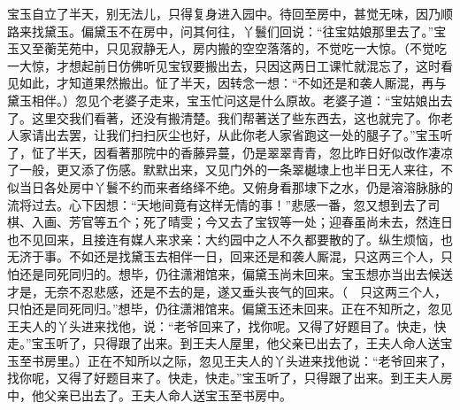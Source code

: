 \begin{parag}
    宝玉自立了半天，别无法儿，只得复身进入园中。待回至房中，甚觉无味，因乃顺路来找黛玉。偏黛玉不在房中，问其何往，丫鬟们回说：“往宝姑娘那里去了。”宝玉又至蘅芜苑中，只见寂静无人，房内搬的空空落落的，不觉吃一大惊。（不觉吃一大惊，才想起前日仿佛听见宝钗要搬出去，只因这两日工课忙就混忘了，这时看见如此，才知道果然搬出。怔了半天，因转念一想：“不如还是和袭人厮混，再与黛玉相伴。）忽见个老婆子走来，宝玉忙问这是什么原故。老婆子道：“宝姑娘出去了。这里交我们看著，还没有搬清楚。我们帮著送了些东西去，这也就完了。你老人家请出去罢，让我们扫扫灰尘也好，从此你老人家省跑这一处的腿子了。”宝玉听了，怔了半天，因看著那院中的香藤异蔓，仍是翠翠青青，忽比昨日好似改作凄凉了一般，更又添了伤感。默默出来，又见门外的一条翠樾埭上也半日无人来往，不似当日各处房中丫鬟不约而来者络绎不绝。又俯身看那埭下之水，仍是溶溶脉脉的流将过去。心下因想：“天地间竟有这样无情的事！”悲感一番，忽又想到去了司棋、入画、芳官等五个；死了晴雯；今又去了宝钗等一处；迎春虽尚未去，然连日也不见回来，且接连有媒人来求亲：大约园中之人不久都要散的了。纵生烦恼，也无济于事。不如还是找黛玉去相伴一日，回来还是和袭人厮混，只这两三个人，只怕还是同死同归的。想毕，仍往潇湘馆来，偏黛玉尚未回来。宝玉想亦当出去候送才是，无奈不忍悲感，还是不去的是，遂又垂头丧气的回来。（　只这两三个人，只怕还是同死同归。”想毕，仍往潇湘馆来。偏黛玉还未回来。正在不知所之，忽见王夫人的丫头进来找他，说：“老爷回来了，找你呢。又得了好题目了。快走，快走。”宝玉听了，只得跟了出来。到王夫人屋里，他父亲已出去了，王夫人命人送宝玉至书房里。）正在不知所以之际，忽见王夫人的丫头进来找他说：“老爷回来了，找你呢，又得了好题目来了。快走，快走。”宝玉听了，只得跟了出来。到王夫人房中，他父亲已出去了。王夫人命人送宝玉至书房中。
\end{parag}


